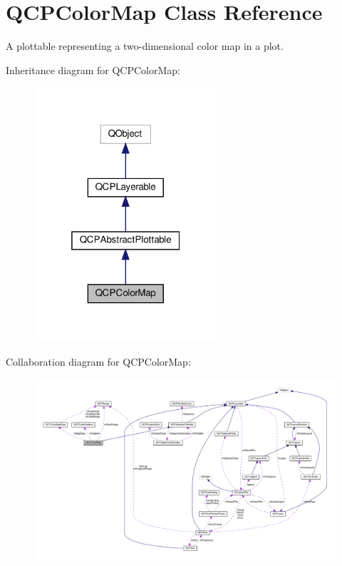 \hypertarget{classQCPColorMap}{}\section{Q\+C\+P\+Color\+Map Class Reference}
\label{classQCPColorMap}


A plottable representing a two-\/dimensional color map in a plot.  




Inheritance diagram for Q\+C\+P\+Color\+Map\+:\nopagebreak
\begin{figure}[H]
\begin{center}
\leavevmode
\includegraphics[width=193pt]{classQCPColorMap__inherit__graph}
\end{center}
\end{figure}


Collaboration diagram for Q\+C\+P\+Color\+Map\+:\nopagebreak
\begin{figure}[H]
\begin{center}
\leavevmode
\includegraphics[width=350pt]{classQCPColorMap__coll__graph}
\end{center}
\end{figure}
